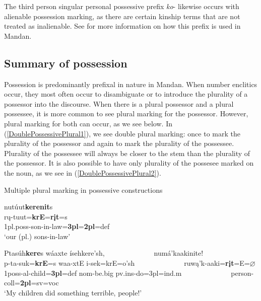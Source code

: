 The third person singular personal possessive prefix \textit{ko}- likewise occurs with alienable possession marking, as there are certain kinship terms that are not treated as inalienable. See  for more information on how this prefix is used in Mandan.

\subsection{Summary of possession}\label{SubSecSummaryOfPossessioN}

Possession is predominantly prefixal in nature in Mandan. When number enclitics occur, they most often occur to disambiguate or to introduce the plurality of a possessor into the discourse. When there is a plural possessor and a plural possessee, it is more common to see plural marking for the possessor. However, plural marking for both can occur, as we see below. In (\ref{DoublePossessivePlural1}), we see double plural marking: once to mark the plurality of the possessor and again to mark the plurality of the possessee. Plurality of the possessee will always be closer to the stem than the plurality of the possessor. It is also possible to have only plurality of the possesee marked on the noun, as we see in (\ref{DoublePossessivePlural2}).

\begin{exe}

\item\label{DoublePossessivePlural} Multiple plural marking in possessive constructions

    \begin{xlist}
    
    \item\label{DoublePossessivePlural1} \glll nutúut\textbf{kerenit}s\\
    rų-tuut=\textbf{krE}=\textbf{rįt}=s\\
    1pl.poss-\textnormal{son-in-law}=\textbf{3pl}=\textbf{2pl}=def\\
    \glt `our (pl.) sons-in-law' \citep[477]{hollow1970}
    
    \item\label{DoublePossessivePlural2} \glll Ptasúh\textbf{kere}s wáaxte ísehkere'sh, ~ ~ ~ ~ ~ ~ ~ ~ numá'kaakinite!\\
    p-ta-suk=\textbf{krE}=s waa-xtE i-sek=krE=o'sh ~ ~ ~ ~ ~ ~ ~ ~ ruwą'k-aaki=\textbf{rįt}=E=$\varnothing$\\
    1poss-al-\textnormal{child}=\textbf{3pl}=def nom-\textnormal{be.big} pv.ins-\textnormal{do}=3pl=ind.m ~ ~ ~ ~ ~ ~ ~ ~ \textnormal{person}-coll=\textbf{2pl}=sv=voc\\
    \glt `My children did something terrible, people!' \citep[178]{hollow1973a}
    
    \end{xlist}

\end{exe}

